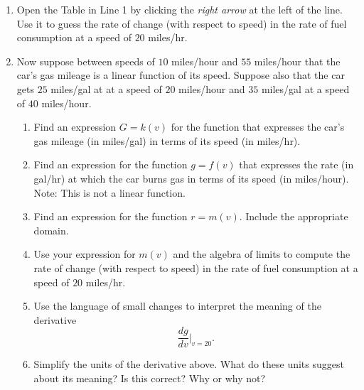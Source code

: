 \documentclass{ximera}
\begin{document}
\begin{question}
\begin{enumerate}
\item Open the Table in Line 1 by clicking the \emph{right arrow} at the left of the line. Use it to guess the rate of change (with respect to speed) in the  rate of fuel consumption at a speed of $20$ miles/hr.

\item Now suppose between speeds of $10$ miles/hour and $55$ miles/hour that the car's gas mileage is a linear function of its speed. Suppose also that the car gets $25$ miles/gal at at a speed of $20$ miles/hour and $35$ miles/gal at a speed of $40$ miles/hour.

\begin{enumerate}
\item Find an expression $G=k(v)$ for the function that expresses the car's gas mileage (in miles/gal) in terms of its speed (in miles/hr).

\item Find an expression for the function $g=f(v)$ that expresses the rate (in gal/hr) at which the car burns gas in terms of its speed (in miles/hour). Note: This is not a linear function.

\item Find an expression for the function $r=m(v)$. Include the appropriate domain.

\item Use your expression for $m(v)$ and the algebra of limits to compute the rate of change (with respect to speed) in the rate of fuel consumption at a speed of $20$ miles/hr.

\item Use the language of small changes to interpret the meaning of the derivative
\[
   \frac{dg}{dv}\Big|_{v=20} .
\]

\item Simplify the units of the derivative above. What do these units suggest about its meaning? Is this correct? Why or why not?

\end{enumerate}

\end{enumerate}
\end{question}
\end{document}
